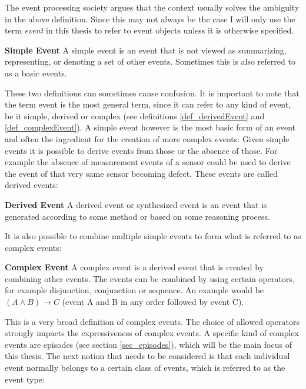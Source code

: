 The event processing society argues that the context usually solves the ambiguity in the above definition. Since this may not always be the case I will only use the term \textit{event} in this thesis to refer to event objects unless it is otherwise specified.

\begin{mydef}
\textbf{Simple Event} A simple event is an event that is not viewed as summarizing, representing, or denoting a set of other events. Sometimes this is also referred to as a basic events.
\end{mydef}

These two definitions can sometimes cause confusion. It is important to note that the term event is the most general term, since it can refer to any kind of event, be it simple, derived or complex (see definitions \ref{def_derivedEvent} and \ref{def_complexEvent}). A simple event however is the most basic form of an event and often the ingredient for the creation of more complex events:
Given simple events it is possible to derive events from those or the absence of those. For example the absence of measurement events of a sensor could be used to derive the event of that very same sensor becoming defect. These events are called derived events:

\begin{mydef}
\label{def_derivedEvent}
\textbf{Derived Event} A derived event or synthesized event is an event that is generated according to some method or based on some reasoning process.
\end{mydef}

It is also possible to combine multiple simple events to form what is referred to as complex events:

\begin{mydef}
\label{def_complexEvent}
\textbf{Complex Event} A complex event is a derived event that is created by combining other events. The events can be combined by using certain operators, for example disjunction, conjunction or sequence. An example would be $(A \land B) \rightarrow C$ (event A and B in any order followed by event C).
\end{mydef}

This is a very broad definition of complex events. The choice of allowed operators strongly impacts the expressiveness of complex events. A specific kind of complex events are episodes (see section \ref{sec_episodes}), which will be the main focus of this thesis.
The next notion that needs to be considered is that each individual event normally belongs to a certain class of events, which is referred to as the event type:

